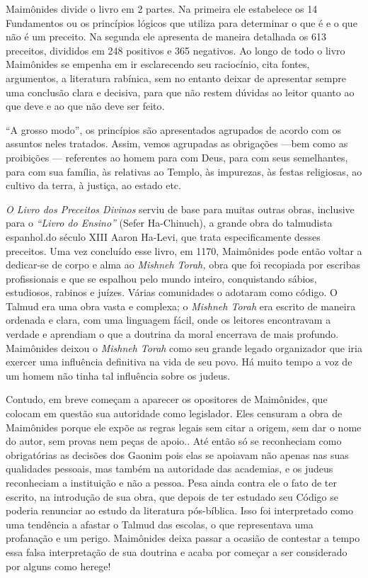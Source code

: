 Maimônides divide o livro em 2 partes. Na primeira ele estabelece os 14
Fundamentos ou os princípios lógicos que utiliza para determinar o que é
e o que não é um preceito. Na segunda ele apresenta de maneira detalhada
os 613 preceitos, divididos em 248 positivos e 365 negativos. Ao longo
de to­do o livro Maimônides se empenha em ir esclarecendo seu
raciocínio, cita fon­tes, argumentos, a literatura rabínica, sem no
entanto deixar de apresentar sem­pre uma conclusão clara e decisiva,
para que não restem dúvidas ao leitor quanto ao que deve e ao que não
deve ser feito.

``A grosso modo'', os princípios são apresentados agrupados de acor­do com
os assuntos neles tratados. Assim, vemos agrupadas as obrigações ---bem
como as proibições --- referentes ao homem para com Deus, para com seus
semelhantes, para com sua família, às relativas ao Templo, às impurezas,
às festas religiosas, ao cultivo da terra, à justiça, ao estado etc.

\emph{O Livro dos Preceitos Divinos} serviu de base para muitas outras
obras, inclusive para o \emph{``Livro do Ensino''} (Sefer Ha-Chinuch), a
grande obra do tal­mudista espanhol.do século XIII Aaron Ha-Levi, que
trata especificamente des­ses preceitos.
Uma vez concluído esse livro, em 1170, Maimônides pode então vol­tar a
dedicar-se de corpo e alma ao \emph{Mishneh Torah,} obra que foi
recopiada por escribas profissionais e que se espalhou pelo mundo
inteiro, conquistando sá­bios, estudiosos, rabinos e juízes. Várias
comunidades o adotaram como códi­go. O Talmud era uma obra vasta e
complexa; o \emph{Mishneh Torah} era escrito de maneira ordenada e
clara, com uma linguagem fácil, onde os leitores encontra­vam a verdade
e aprendiam o que a doutrina da moral encerrava de mais pro­fundo.
Maimônides deixou o \emph{Mishneh Torah} como seu grande legado
organi­zador que iria exercer uma influência definitiva na vida de seu
povo. Há muito tempo a voz de um homem não tinha tal influência sobre os
judeus.

Contudo, em breve começam a aparecer os opositores de Maimôni­des, que
colocam em questão sua autoridade como legislador. Eles censuram a obra
de Maimônides porque ele expõe as regras legais sem citar a origem, sem
dar o nome do autor, sem provas nem peças de apoio.. Até então só se
reconhe­ciam como obrigatórias as decisões dos Gaonim pois elas se
apoiavam não ape­nas nas suas qualidades pessoais, mas também na
autoridade das academias, e os judeus reconheciam a instituição e não a
pessoa. Pesa ainda contra ele o fato de ter escrito, na introdução de
sua obra, que depois de ter estudado seu Códi­go se poderia renunciar ao
estudo da literatura pós-bíblica. Isso foi interpreta­do como uma
tendência a afastar o Talmud das escolas, o que representava uma
profanação e um perigo. Maimônides deixa passar a ocasião de contestar a
tem­po essa falsa interpretação de sua doutrina e acaba por começar a
ser conside­rado por alguns como herege!

